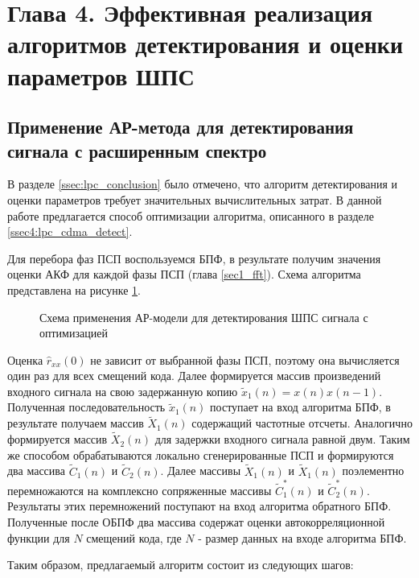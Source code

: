 \section{Глава 4. Эффективная реализация алгоритмов детектирования и оценки параметров ШПС}

\subsection{Применение АР-метода для детектирования сигнала с расширенным спектро}

В разделе \ref{ssec:lpc_conclusion} было отмечено, что алгоритм детектирования и оценки параметров
требует значительных вычислительных затрат. В данной работе предлагается способ оптимизации алгоритма,
описанного в разделе \ref{ssec4:lpc_cdma_detect}.

Для перебора фаз ПСП воспользуемся БПФ, в результате получим значения оценки АКФ для каждой фазы ПСП (глава \ref{sec1_fft}).
Схема алгоритма представлена на рисунке \ref{pic:lpc_basic2}. 

\begin{figure}[H]
	\center{}
	\caption{Схема применения АР-модели для детектирования ШПС сигнала с оптимизацией}
	\label{pic:lpc_basic2}
\end{figure}

Оценка ${\hat{r}_{xx}(0)}$ не зависит от выбранной фазы ПСП, поэтому она вычисляется один
раз для всех смещений кода. Далее формируется массив произведений входного сигнала на
свою задержанную копию ${\tilde{x}_1(n)=x(n)x(n-1)}$. Полученная последовательность  
${\tilde{x}_1(n)}$ поступает на вход алгоритма БПФ, в результате получаем массив ${\tilde{X}_1(n)}$
содержащий частотные отсчеты. Аналогично формируется массив  ${\tilde{X}_2(n)}$ для
задержки входного сигнала равной двум. Таким же способом обрабатываются локально
сгенерированные ПСП и формируются два массива ${\tilde{C}_1(n)}$ и ${\tilde{C}_2(n)}$.
Далее массивы ${\tilde{X}_1(n)}$ и ${\tilde{X}_1(n)}$ поэлементно перемножаются
на комплексно сопряженные массивы ${\tilde{C}_1^*(n)}$ и ${\tilde{C}_2^*(n)}$.
Результаты этих перемножений поступают на вход алгоритма обратного
БПФ. Полученные после ОБПФ два массива содержат оценки автокорреляционной функции для ${N}$ 
смещений кода, где  ${N}$ - размер данных на входе алгоритма БПФ.

Таким образом, предлагаемый алгоритм состоит из следующих шагов:

